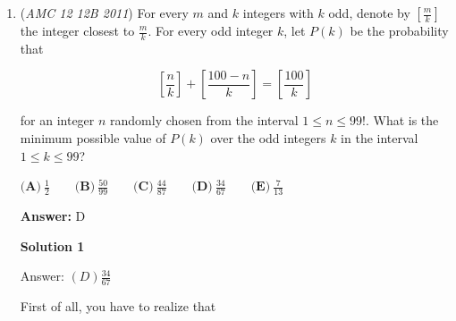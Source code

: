 \begin{enumerate}
 


 Now we have a solution at $\frac{n\pi}{4}$ if we look at them in polar coordinate, further more, the 8-gon is symmetric (it is an equilateral octagon) . So we only need to find the side length of one and multiply by $8$.

 So answer $= 8 \times$ distance from $1$ to $\left(\frac{\sqrt{3}}{2} + \frac{1}{2}\right)\left(1 + i\right)$

 Side length $= \sqrt{\left(\frac{\sqrt{3}}{2} - \frac{1}{2}\right)^2 + \left(\frac{\sqrt{3}}{2} + \frac{1}{2}\right)^2} = \sqrt{2\left(\frac{3}{4} + \frac{1}{4}\right)} = \sqrt{2}$

 Hence, answer is $8\sqrt{2}$.

 



\textbf{Solution 2}

Use the law of cosines.We make $a$ the distance.Now, since the angle does not change the distance from the origin, we can just use the distance. $a^2 = (\frac{\sqrt{3}}{\sqrt{2}} + \frac{1}{\sqrt{2}})^2 + 1^2 -2 \times \Big( \frac{\sqrt{3}}{\sqrt{2}} + \frac{1}{\sqrt{2}} \Big)\times 1 \times \cos \frac{\pi}{4}$, which simplifies to $a^2= 2 + \sqrt3 +1 - 1 - \sqrt3$, or $a^2=2$, or $a=\sqrt2$.Multiply the answer by 8 to get $\boxed{ (B) 8\sqrt2}$



	\item (\textit{AMC 12 12B 2011}) For every $m$ and $k$ integers with $k$ odd, denote by $\left[\frac{m}{k}\right]$ the integer closest to $\frac{m}{k}$. For every odd integer $k$, let $P(k)$ be the probability that


 
 \[\left[\frac{n}{k}\right] + \left[\frac{100 - n}{k}\right] = \left[\frac{100}{k}\right]\]


 for an integer $n$ randomly chosen from the interval $1 \leq n \leq 99!$. What is the minimum possible value of $P(k)$ over the odd integers $k$ in the interval $1 \leq k \leq 99$?


 $\textbf{(A)}\ \frac{1}{2} \qquad \textbf{(B)}\ \frac{50}{99} \qquad \textbf{(C)}\ \frac{44}{87} \qquad \textbf{(D)}\  \frac{34}{67} \qquad \textbf{(E)}\  \frac{7}{13}$

 \textbf{Answer: }D



\textbf{Solution 1}

Answer: $(D)  \frac{34}{67}$

 
First of all, you have to realize that 


\end{enumerate}
